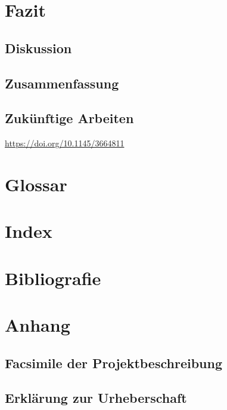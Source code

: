 \documentclass[a4paper,12pt]{report}
\begin{document}
    \chapter{Fazit}


    \section{Diskussion}


    \section{Zusammenfassung}


    \section{Zukünftige Arbeiten}
    \url{https://doi.org/10.1145/3664811}


    \chapter{Glossar}


    \chapter{Index}


    \chapter{Bibliografie}


    \chapter{Anhang}


    \section{Facsimile der Projektbeschreibung}


    \section{Erklärung zur Urheberschaft}
\end{document}
